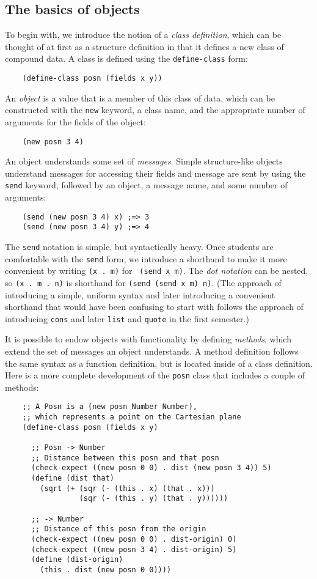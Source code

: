 \documentclass[submission,copyright]{eptcs}
\begin{document}
\subsection{The basics of objects}

To begin with, we introduce the notion of a \emph{class definition},
which can be thought of at first as a structure definition in that
it defines a new class of compound data.  A class is defined using the
{\tt define-class} form:
\begin{verbatim}
    (define-class posn (fields x y))
\end{verbatim}
An \emph{object} is a value that is a member of this class of data,
which can be constructed with the {\tt new} keyword, a class name, and
the appropriate number of arguments for the fields of the object:
\begin{verbatim}
    (new posn 3 4)
\end{verbatim}
An object understands some set of \emph{messages}.  Simple
structure-like objects understand messages for accessing their fields
and message are sent by using the {\tt send} keyword, followed by an object,
a message name, and some number of arguments:
\begin{verbatim}
    (send (new posn 3 4) x) ;=> 3
    (send (new posn 3 4) y) ;=> 4
\end{verbatim}
The {\tt send} notation is simple, but syntactically heavy.  Once
students are comfortable with the {\tt send} form, we introduce a
shorthand to make it more convenient by writing {\tt (x . m)} for {\tt
  (send x m)}.  The \emph{dot notation} can be nested, so {\tt (x . m
  . n)} is shorthand for {\tt (send (send x m) n)}.  (The approach of
introducing a simple, uniform syntax and later introducing a
convenient shorthand that would have been confusing to start with
follows the approach of introducing {\tt cons} and later {\tt list}
and {\tt quote} in the first semester.)


It is possible to endow objects with functionality by defining \emph{methods},
which extend the set of messages an object understands.  A method definition
follows the same syntax as a function definition, but is located inside of a
class definition.  Here is a more complete development of the {\tt posn} class
that includes a couple of methods:
\begin{verbatim}
    ;; A Posn is a (new posn Number Number),
    ;; which represents a point on the Cartesian plane
    (define-class posn (fields x y)

      ;; Posn -> Number
      ;; Distance between this posn and that posn
      (check-expect ((new posn 0 0) . dist (new posn 3 4)) 5)
      (define (dist that)
        (sqrt (+ (sqr (- (this . x) (that . x)))
                 (sqr (- (this . y) (that . y))))))

      ;; -> Number
      ;; Distance of this posn from the origin
      (check-expect ((new posn 0 0) . dist-origin) 0)
      (check-expect ((new posn 3 4) . dist-origin) 5)
      (define (dist-origin)
        (this . dist (new posn 0 0))))
\end{verbatim}
\end{document}
